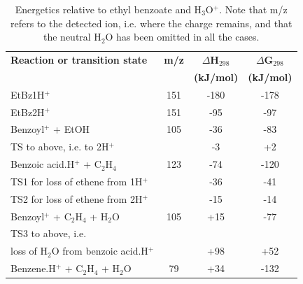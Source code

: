 \begin{table}%
\centering
\caption[Energetics relative to ethyl benzoate and H$_3$O$^+$.]{Energetics relative to ethyl benzoate and H$_3$O$^+$. Note that m/z refers to the detected ion, i.e. where the charge remains, and that the neutral H$_2$O has been omitted in all the cases.}
\label{tb:eb2}
\begin{tabular}{lccc}
\toprule
\textbf{Reaction or transition state}	&\textbf{m/z} &\textbf{$\Delta$H$_{298}$} &\textbf{$\Delta$G$_{298}$}\\
& &	\textbf{(kJ/mol)} &\textbf{(kJ/mol)} \\  \toprule
EtBz1H$^+$   					&	151	& -180  & -178   \\ \midrule
EtBz2H$^+$   					&	151	& -95  & -97   \\ \midrule
Benzoyl$^+$  + EtOH				&	105	& -36  & -83   \\ \midrule
TS to above, i.e. to 2H$^+$		&		& -3  & +2   \\ \midrule
Benzoic acid.H$^+$ + C$_2$H$_4$	&	123	& -74  & -120   \\ \midrule
TS1 for loss of ethene from 1H$^+$	&		& -36  & -41   \\ \midrule
TS2 for loss of ethene from 2H$^+$	&		& -15  & -14   \\ \midrule
Benzoyl$^+$  + C$_2$H$_4$ + H$_2$O	&	105	& +15  & -77   \\ \midrule
TS3 to above, i.e.	&		&   &    \\ 
loss of H$_2$O from benzoic acid.H$^+$	&		& +98  & +52   \\ \midrule
Benzene.H$^+$	+ C$_2$H$_4$ + H$_2$O &	79	& +34  & -132   \\ 
\bottomrule
\end{tabular}
\end{table}


